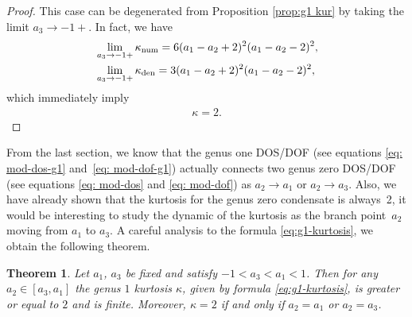 \documentclass[pdftex]{sigma}
\numberwithin{equation}{section}
\newtheorem{Theorem}{Theorem}[section]
\def\ra{\rightarrow}
\begin{document}
\begin{proof}
This case can be degenerated from Proposition \ref{prop:g1 kur} by taking the limit $a_3\ra-1+$. In fact, we have
\begin{align*}
&\lim_{a_3\ra-1+}\kappa_{\rm num}=6 (a_{1}-a_{2}+2 )^{2} (a_{1}-a_{2}-2 )^{2},\\
&\lim_{a_3\ra-1+}\kappa_{\rm den}=3 (a_{1}-a_{2}+2 )^{2} (a_{1}-a_{2}-2 )^{2},
\end{align*}
which immediately imply
\begin{align*}
\kappa = 2.
\tag*{\qed}
\end{align*}
\renewcommand{\qed}{}
\end{proof}


From the last section, we know that the genus one DOS/DOF (see equations \eqref{eq: mod-dos-g1} and~\eqref{eq: mod-dof-g1}) actually connects two genus zero DOS/DOF (see equations \eqref{eq: mod-dos} and \eqref{eq: mod-dof}) as $a_2\ra a_1$ or $a_2\ra a_3$. Also, we have already shown that the kurtosis for the genus zero condensate is always~2, it would be interesting to study the dynamic of the kurtosis as the branch point~$a_2$ moving from $a_1$ to $a_3$. A careful analysis to the formula \eqref{eq:g1-kurtosis}, we obtain the following theorem.

\begin{Theorem}\label{Thm:g1 kappa ineq}
Let $a_1$, $a_3$ be fixed and satisfy $-1<a_3<a_1<1$. Then for any $a_2\in [a_3,a_1]$ the genus $1$ kurtosis $\kappa$, given by formula \eqref{eq:g1-kurtosis}, is greater or equal to $2$ and is finite. Moreover, $\kappa=2$ if and only if $a_2=a_1$ or $a_2=a_3$.






\end{Theorem}
\end{document}
